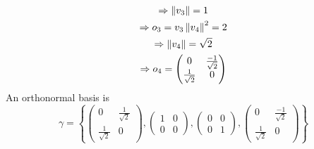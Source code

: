 \begin{enumerate}
\begin{itemize}
\begin{gather}
\Rightarrow \left\lVert v_3\right\rVert = 1\\
\Rightarrow o_3 = v_3
\left\lVert v_4\right\rVert^2 =2 \\
\Rightarrow \left\lVert v_4\right\rVert = \sqrt{2}\\
\Rightarrow o_4 = \begin{pmatrix}
0 & \frac{-1}{\sqrt{2}}\\
\frac{1}{\sqrt{2}} & 0
\end{pmatrix}
\end{gather}
An orthonormal basis is
\begin{equation}
\gamma = \left\{
\begin{pmatrix}
0 & \frac{1}{\sqrt{2}}\\
\frac{1}{\sqrt{2}} & 0
\end{pmatrix},
\begin{pmatrix}
1 & 0 \\
0 & 0 
\end{pmatrix}
,
\begin{pmatrix}
0 & 0 \\
0 & 1
\end{pmatrix}
,
\begin{pmatrix}
0 & \frac{-1}{\sqrt{2}}\\
\frac{1}{\sqrt{2}} & 0
\end{pmatrix}
\right\}
\end{equation}
\end{itemize}
\end{enumerate}
